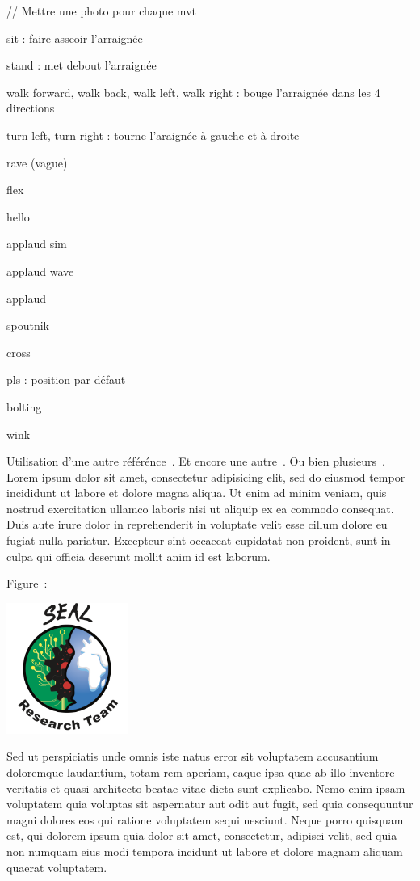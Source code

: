 // Mettre une photo pour chaque mvt		

sit : faire asseoir l'arraignée

stand : met debout l'arraignée

walk forward, walk back, walk left, walk right : bouge l'arraignée dans les 4 directions

turn left, turn right : tourne l'araignée à gauche et à droite

rave (vague)

flex

hello

applaud sim

applaud wave

applaud

spoutnik

cross

pls : position par défaut

bolting

wink

Utilisation d'une autre référénce~\cite{NOM05}. Et encore une autre~\cite{NOM12}. Ou bien plusieurs~\cite{WEB13, NOM09, NOM07}.
Lorem ipsum dolor sit amet, consectetur adipisicing elit, sed do eiusmod tempor incididunt ut labore et dolore magna aliqua. Ut enim ad minim veniam, quis nostrud exercitation ullamco laboris nisi ut aliquip ex ea commodo consequat. Duis aute irure dolor in reprehenderit in voluptate velit esse cillum dolore eu fugiat nulla pariatur. Excepteur sint occaecat cupidatat non proident, sunt in culpa qui officia deserunt mollit anim id est laborum.

Figure~:

\includegraphics[width=0.3\textwidth]{./img/logo_equipe_robotique_exploration}

Sed ut perspiciatis unde omnis iste natus error sit voluptatem accusantium doloremque laudantium, totam rem aperiam, eaque ipsa quae ab illo inventore veritatis et quasi architecto beatae vitae dicta sunt explicabo. Nemo enim ipsam voluptatem quia voluptas sit aspernatur aut odit aut fugit, sed quia consequuntur magni dolores eos qui ratione voluptatem sequi nesciunt. Neque porro quisquam est, qui dolorem ipsum quia dolor sit amet, consectetur, adipisci velit, sed quia non numquam eius modi tempora incidunt ut labore et dolore magnam aliquam quaerat voluptatem. 

